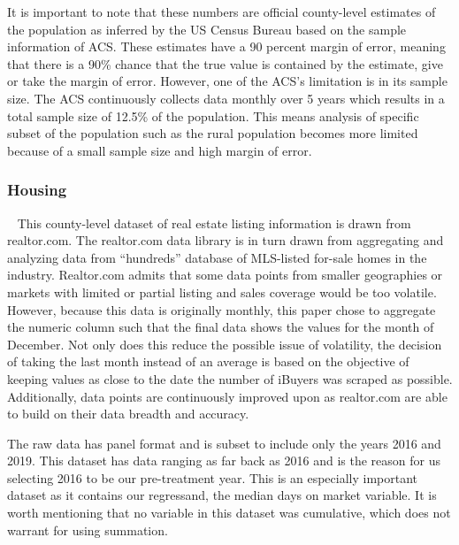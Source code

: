 It is important to note that these numbers are official county-level estimates of the population as inferred by the US Census Bureau based on the sample information of ACS. These estimates have a 90 percent margin of error, meaning that there is a 90\% chance that the true value is contained by the estimate, give or take the margin of error. However, one of the ACS’s limitation is in its sample size. The ACS continuously collects data monthly over 5 years which results in a total sample size of 12.5\% of the population. This means analysis of specific subset of the population such as the rural population becomes more limited because of a small sample size and high margin of error.  

\subsubsection{Housing}\label{subsubsec_housing} 
This county-level dataset of real estate listing information is drawn from realtor.com. The realtor.com data library is in turn drawn from aggregating and analyzing data from “hundreds” database of MLS-listed for-sale homes in the industry. Realtor.com admits that some data points from smaller geographies or markets with limited or partial listing and sales coverage would be too volatile. However, because this data is originally monthly, this paper chose to aggregate the numeric column such that the final data shows the values for the month of December. Not only does this reduce the possible issue of volatility, the decision of taking the last month instead of an average is based on the objective of keeping values as close to the date the number of iBuyers was scraped as possible. Additionally, data points are continuously improved upon as realtor.com are able to build on their data breadth and accuracy.   

The raw data has panel format and is subset to include only the years 2016 and 2019. This dataset has data ranging as far back as 2016 and is the reason for us selecting 2016 to be our pre-treatment year. This is an especially important dataset as it contains our regressand, the median days on market variable. It is worth mentioning that no variable in this dataset was cumulative, which does not warrant for using summation. 


